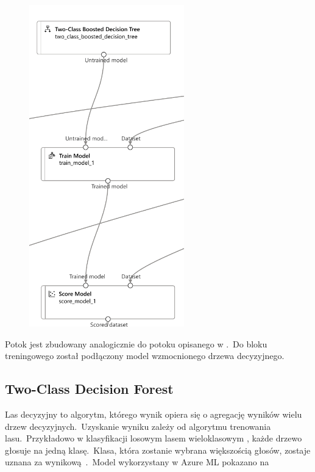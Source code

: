 \begin{figure}[H]
    \centering
    \includegraphics[width=0.6\textwidth]{images/dt_pipe}
    \label{fig:dt-pipe}
\end{figure}

Potok jest zbudowany analogicznie do potoku opisanego w .\ Do bloku treningowego został podłączony model wzmocnionego drzewa decyzyjnego.

\subsection{Two-Class Decision Forest}
Las decyzyjny to algorytm, którego wynik opiera się o agregację wyników wielu drzew decyzyjnych.\ Uzyskanie wyniku zależy od algorytmu trenowania lasu.\ Przykładowo w klasyfikacji losowym lasem wieloklasowym , każde drzewo głosuje na jedną klasę.\ Klasa, która zostanie wybrana większością głosów, zostaje uznana za wynikową~\cite{Google}.\ Model wykorzystany w Azure ML pokazano na 

